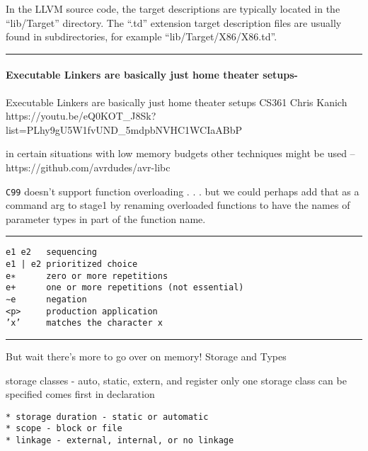 In the LLVM source code, the target descriptions are typically located
in the ``lib/Target'' directory. The ``.td'' extension target
description files are usually found in subdirectories, for example
``lib/Target/X86/X86.td''.

\begin{center}\rule{0.5\linewidth}{0.5pt}\end{center}

\hypertarget{executable-linkers-are-basically-just-home-theater-setups-}{%
\paragraph{Executable Linkers are basically just home theater
setups-}\label{executable-linkers-are-basically-just-home-theater-setups-}}

Executable Linkers are basically just home theater setups CS361 Chris
Kanich
https://youtu.be/eQ0KOT\_J8Sk?list=PLhy9gU5W1fvUND\_5mdpbNVHC1WCIaABbP

in certain situations with low memory budgets other techniques might be
used --https://github.com/avrdudes/avr-libc

\texttt{C99} doesn't support function overloading . . . but we could
perhaps add that as a command arg to stage1 by renaming overloaded
functions to have the names of parameter types in part of the function
name.

\begin{center}\rule{0.5\linewidth}{0.5pt}\end{center}

\begin{verbatim}
e1 e2   sequencing
e1 | e2 prioritized choice
e∗      zero or more repetitions
e+      one or more repetitions (not essential)
∼e      negation
<p>     production application
’x’     matches the character x
\end{verbatim}

\begin{center}\rule{0.5\linewidth}{0.5pt}\end{center}

But wait there's more to go over on memory! Storage and Types

storage classes - auto, static, extern, and register only one storage
class can be specified comes first in declaration

\begin{verbatim}
* storage duration - static or automatic
* scope - block or file
* linkage - external, internal, or no linkage
\end{verbatim}

